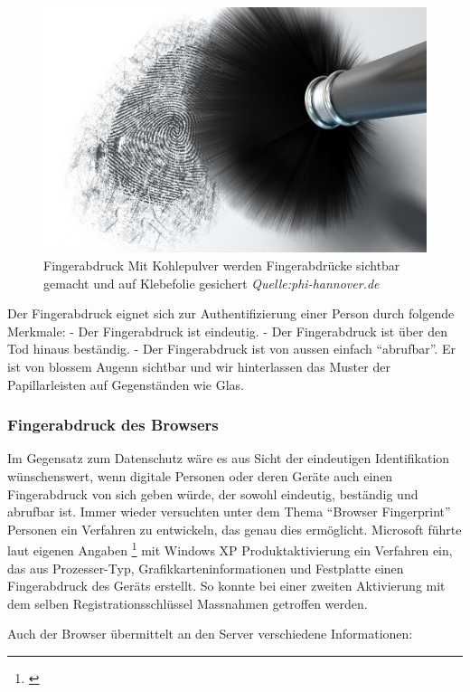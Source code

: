 \begin{figure}[htbp]
\centering
\includegraphics{images/fingerabdruck.jpg}
\caption{Fingerabdruck Mit Kohlepulver werden Fingerabdrücke sichtbar
gemacht und auf Klebefolie gesichert \emph{Quelle:phi-hannover.de}}
\end{figure}

Der Fingerabdruck eignet sich zur Authentifizierung einer Person durch
folgende Merkmale: - Der Fingerabdruck ist eindeutig. - Der
Fingerabdruck ist über den Tod hinaus beständig. - Der Fingerabdruck ist
von aussen einfach ``abrufbar''. Er ist von blossem Augenn sichtbar und
wir hinterlassen das Muster der Papillarleisten auf Gegenständen wie
Glas.

\subsubsection{Fingerabdruck des
Browsers}\label{fingerabdruck-des-browsers}

Im Gegensatz zum Datenschutz wäre es aus Sicht der eindeutigen
Identifikation wünschenswert, wenn digitale Personen oder deren Geräte
auch einen Fingerabdruck von sich geben würde, der sowohl eindeutig,
beständig und abrufbar ist. Immer wieder versuchten unter dem Thema
``Browser Fingerprint'' Personen ein Verfahren zu entwickeln, das genau
dies ermöglicht. Microsoft führte laut eigenen Angaben \footnote{\autocite{xpactivation}}
mit Windows XP Produktaktivierung ein Verfahren ein, das aus
Prozesser-Typ, Grafikkarteninformationen und Festplatte einen
Fingerabdruck des Geräts erstellt. So konnte bei einer zweiten
Aktivierung mit dem selben Registrationsschlüssel Massnahmen getroffen
werden.

Auch der Browser übermittelt an den Server verschiedene Informationen:

